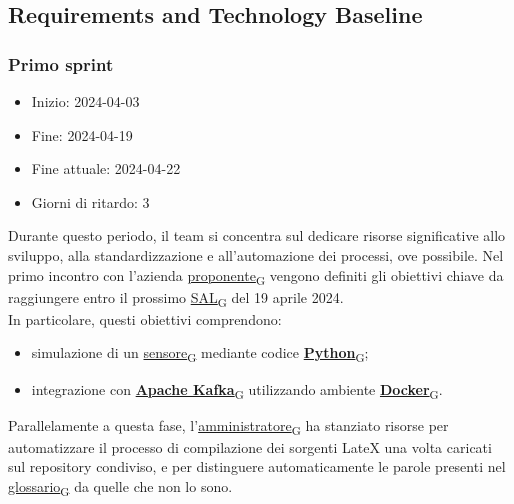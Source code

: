 \subsection{Requirements and Technology Baseline}
\subsubsection{Primo sprint}
\begin{itemize}
	\item Inizio: 2024-04-03
	\item Fine: 2024-04-19
	\item Fine attuale: 2024-04-22
	\item Giorni di ritardo: 3
\end{itemize}

Durante questo periodo, il team si concentra sul dedicare risorse significative allo sviluppo, alla standardizzazione e all'automazione dei processi, ove possibile. Nel primo incontro con l'azienda \href{https://7last.github.io/docs/pb/documentazione-interna/glossario\#proponente}{proponente\textsubscript{G}} vengono definiti gli obiettivi chiave da raggiungere entro il prossimo \href{https://7last.github.io/docs/pb/documentazione-interna/glossario\#stato-avanzamento-lavori}{SAL\textsubscript{G}} del 19 aprile 2024. \\
In particolare, questi obiettivi comprendono:
\begin{itemize}
	\item simulazione di un \href{https://7last.github.io/docs/pb/documentazione-interna/glossario\#sensore}{sensore\textsubscript{G}} mediante codice \href{https://7last.github.io/docs/pb/documentazione-interna/glossario\#python}{\textbf{Python}\textsubscript{G}};
	\item integrazione con \href{https://7last.github.io/docs/pb/documentazione-interna/glossario\#apache-kafka}{\textbf{Apache Kafka}\textsubscript{G}} utilizzando ambiente \href{https://7last.github.io/docs/pb/documentazione-interna/glossario\#docker}{\textbf{Docker}\textsubscript{G}}.
\end{itemize}
Parallelamente a questa fase, l'\href{https://7last.github.io/docs/pb/documentazione-interna/glossario\#amministratore}{amministratore\textsubscript{G}} ha stanziato risorse per automatizzare il processo di compilazione dei sorgenti LateX una volta caricati sul repository condiviso, e per distinguere automaticamente le parole presenti nel \href{https://7last.github.io/docs/pb/documentazione-interna/glossario#glossario}{glossario\textsubscript{G}} da quelle che non lo sono.

